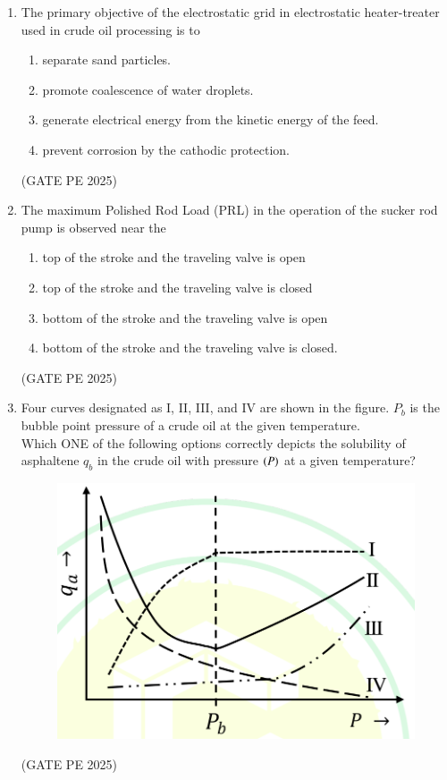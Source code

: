 \documentclass[journal,12pt,onecolumn]{IEEEtran}
\theoremstyle{remark}
\begin{document}
\begin{enumerate}
\item The primary objective of the electrostatic grid in electrostatic heater-treater used in crude oil processing is to
\begin{enumerate}
    \item separate sand particles.
    \item promote coalescence of water droplets.
    \item generate electrical energy from the kinetic energy of the feed.
    \item prevent corrosion by the cathodic protection.
\end{enumerate}
\hfill{(GATE PE 2025)}

\item The maximum Polished Rod Load (PRL) in the operation of the sucker rod pump is observed near the
\begin{enumerate}
    \item top of the stroke and the traveling valve is open
    \item top of the stroke and the traveling valve is closed
    \item bottom of the stroke and the traveling valve is open
    \item bottom of the stroke and the traveling valve is closed.
\end{enumerate}
\hfill{(GATE PE 2025)}

\item Four curves designated as I, II, III, and IV are shown in the figure. $P_b$ is the bubble point pressure of a crude oil at the given temperature.\\
Which ONE of the following options correctly depicts the solubility of asphaltene $q_b$ in the crude oil with pressure $\left(P\right)$ at a given temperature?
\begin{figure}[H]
    \centering
    \includegraphics[width=0.4\columnwidth]{25Q17.png}
    \caption{}
    \label{fig:placeholder}
\end{figure}
\begin{enumerate}
\end{enumerate}
\hfill{(GATE PE 2025)}


\end{enumerate}
\end{document}

